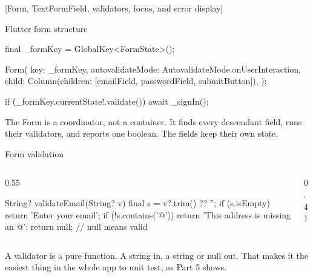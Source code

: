 \documentclass[10pt,aspectratio=169,t]{beamer}
\begin{document}
[Form, TextFormField, validators, focus, and error display]

\begin{frame}[fragile,eyebrow=Forms]{Flutter form structure}
\begin{dart}
final _formKey = GlobalKey<FormState>();

Form(
  key: _formKey,
  autovalidateMode: AutovalidateMode.onUserInteraction,
  child: Column(children: [emailField, passwordField, submitButton]),
);

if (_formKey.currentState!.validate()) await _signIn();
\end{dart}
  \begin{takeaway}{The Form is a coordinator, not a container.}
    It finds every descendant field, runs their validators, and reports one boolean. The fields keep their own state.
  \end{takeaway}
\end{frame}

\begin{frame}[fragile,eyebrow=Forms]{Form validation}
  \begin{columns}[T]
    \begin{column}{0.55\textwidth}
\begin{dart}
String? validateEmail(String? v) {
  final s = v?.trim() ?? '';
  if (s.isEmpty) return 'Enter your email';
  if (!s.contains('@')) {
    return 'This address is missing an @';
  }
  return null;   // null means valid
}
\end{dart}
    \end{column}
    \begin{column}{0.41\textwidth}
    \end{column}
  \end{columns}
  \begin{takeaway}{A validator is a pure function.}
    A string in, a string or null out. That makes it the easiest thing in the whole app to unit test, as Part 5 shows.
  \end{takeaway}
\end{frame}
\end{document}
